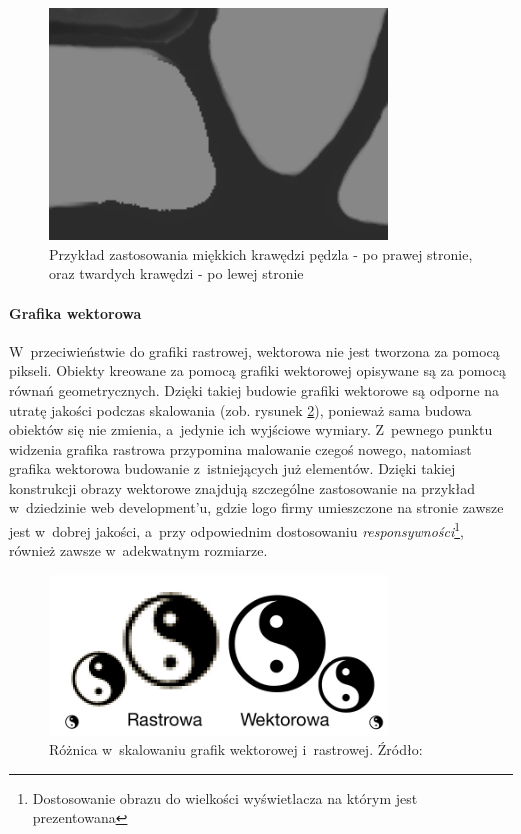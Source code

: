 \documentclass[12pt,a4paper,oneside]{book}
\theoremstyle{definition}
\numberwithin{equation}{chapter}
\begin{document}
\begin{figure}[hpt!]
        \centering
        \includegraphics[width=0.8\textwidth]{images/smooth.png}
        \caption{Przykład zastosowania miękkich krawędzi pędzla - po prawej stronie, \\ oraz twardych krawędzi - po lewej stronie}
        \label{RasterGraphics_2}
\end{figure}

\paragraph{Grafika wektorowa}\hfill \break

\par W~przeciwieństwie do grafiki rastrowej, wektorowa nie jest tworzona za pomocą pikseli. Obiekty kreowane za pomocą grafiki wektorowej opisywane są za pomocą równań geometrycznych. Dzięki takiej budowie grafiki wektorowe są odporne na utratę jakości podczas skalowania (zob. rysunek \ref{VectorGraphics}), ponieważ sama budowa obiektów się nie zmienia, a~jedynie ich wyjściowe wymiary. Z~pewnego punktu widzenia grafika rastrowa przypomina malowanie czegoś nowego, natomiast grafika wektorowa budowanie z~istniejących już elementów. Dzięki takiej konstrukcji obrazy wektorowe znajdują szczególne zastosowanie na przykład w~dziedzinie web development'u, gdzie logo firmy umieszczone na stronie zawsze jest w~dobrej jakości, a~przy odpowiednim dostosowaniu \textit{responsywności}\footnote{Dostosowanie obrazu do wielkości wyświetlacza na którym jest prezentowana}, również zawsze w~adekwatnym rozmiarze.

\begin{figure}[hpt!]
        \centering
        \includegraphics[width=0.8\textwidth]{images/rastrowa-wektorowa.jpg}
        \caption{Różnica w~skalowaniu grafik wektorowej i~rastrowej. Źródło: \cite{Vector}}
        \label{VectorGraphics}
\end{figure}
\end{document}
